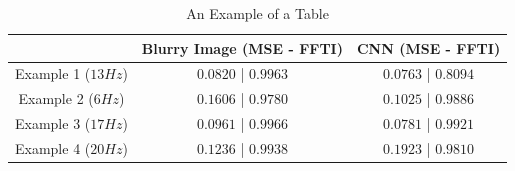 \documentclass[conference]{IEEEtran}
\begin{document}
\begin{table}[!t]
\renewcommand{\arraystretch}{1.2}
\caption{An Example of a Table}
\label{table_caso_5}
\centering
\begin{tabular}{|c||c||c|}
\hline
  & Blurry Image (MSE - FFTI) & CNN (MSE - FFTI)\\
\hline
Example 1 ($13Hz$) & $0.0820$ | $0.9963$ & $0.0763$ | $0.8094$\\
\hline
Example 2 ($6Hz$)& $0.1606$ | $0.9780$ & $0.1025$ | $0.9886$\\
\hline
Example 3 ($17Hz$)& $0.0961$ | $0.9966$ & $0.0781$ | $0.9921$\\
\hline
Example 4 ($20Hz$)& $0.1236$ | $0.9938$ & $0.1923$ | $0.9810$\\
\hline
\end{tabular}
\end{table}
\end{document}
